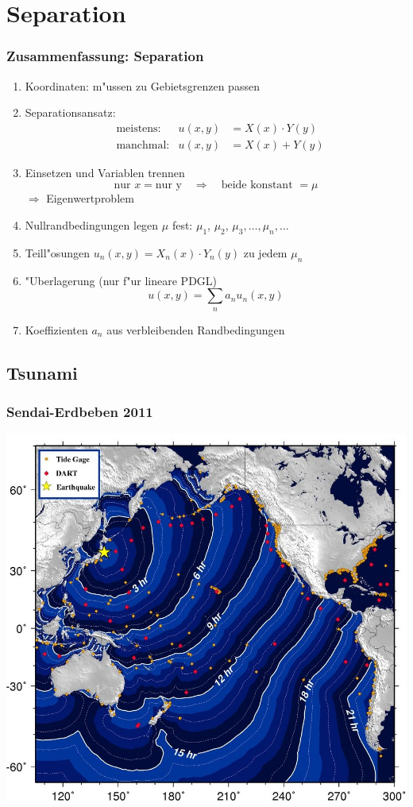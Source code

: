 %
% 
\section{Separation}

\begin{frame}
\frametitle{Zusammenfassung: Separation}
\begin{enumerate}
\item Koordinaten: m"ussen zu Gebietsgrenzen passen
\item Separationsansatz: 
\begin{align*}
&\text{meistens:}&u(x,y)&=X(x)\cdot Y(y)\\
&\text{manchmal:}&u(x,y)&=X(x)+Y(y)
\end{align*}
\item Einsetzen und Variablen trennen
\[
\text{nur $x$} = \text{nur y}\quad\Rightarrow\quad \text{beide konstant $=\mu$}
\]
$\Rightarrow$ Eigenwertproblem
\item Nullrandbedingungen legen $\mu$ fest: $\mu_1$, $\mu_2$,
$\mu_3,\dots,\mu_n,\dots$
\item Teill"osungen $u_n(x,y)=X_n(x)\cdot Y_n(y)$  zu jedem $\mu_n$
\item "Uberlagerung (nur f"ur lineare PDGL)
\[
u(x,y)=\sum_n a_nu_n(x,y)
\]
\item Koeffizienten $a_n$ aus verbleibenden Randbedingungen
\end{enumerate}
\end{frame}

\begin{frame}
\section{Tsunami}
\frametitle{Sendai-Erdbeben 2011}
\begin{center}
\includegraphics[width=0.85\hsize]{../../skript/graphics/sendainoaa.jpg}
\end{center}
\end{frame}

